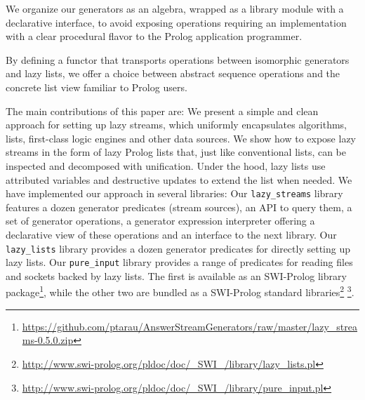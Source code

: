 \documentclass[submission,copyright,creativecommons]{eptcs}
\begin{document}
We organize our generators as an algebra, wrapped as a library module with a declarative interface, to avoid exposing  operations requiring an implementation with a clear procedural flavor to the Prolog application programmer.

By defining a functor that transports operations between isomorphic
generators and lazy lists, we offer a choice between 
abstract sequence operations and the concrete list view familiar to Prolog users.



The main contributions of this paper are:
\BI
\I We present a simple and clean approach for setting up lazy streams, which
   uniformly encapsulates algorithms, lists, first-class logic engines and other data sources.
\I We show how to expose lazy streams in the form of lazy Prolog lists
   that, just like conventional lists, can be inspected and decomposed with unification.
   Under the hood, lazy lists use attributed variables and destructive updates to
   extend the list when needed.
\I We have implemented our approach in several libraries:
   \BE 
   \I Our \texttt{lazy\_streams} library
features a dozen generator predicates (stream sources), an API to query
them, a set of generator  operations, a generator expression interpreter
offering a declarative view of these operations and an interface to
the next library. 
   \I Our \texttt{lazy\_lists} library provides a dozen generator predicates for 
      directly setting up lazy lists.
   \I Our \texttt{pure\_input} library provides a range of predicates for reading
      files and sockets backed by lazy lists.
   \EE
   The first is available as an SWI-Prolog
library package\footnote{%
\url{https://github.com/ptarau/AnswerStreamGenerators/raw/master/lazy_streams-0.5.0.zip}},
  while the other two are bundled as a SWI-Prolog standard libraries\footnote{
\url{http://www.swi-prolog.org/pldoc/doc/_SWI_/library/lazy_lists.pl}}
\footnote{
\url{http://www.swi-prolog.org/pldoc/doc/_SWI_/library/pure_input.pl}}.
\EI
\end{document}

